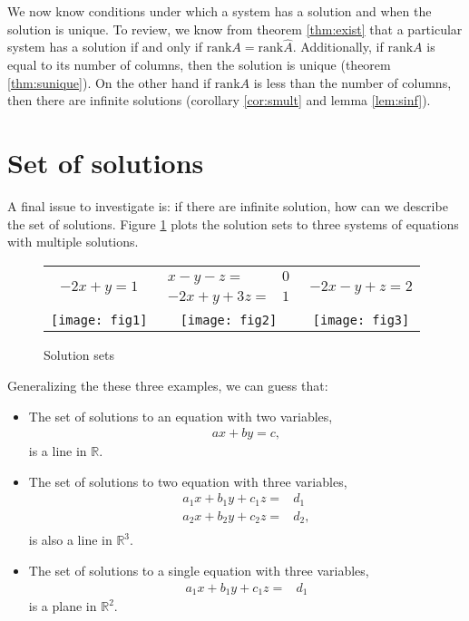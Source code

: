 \documentclass[12pt,reqno]{amsart}
\newcommand{\rank}{\mathrm{rank}}
\theoremstyle{definition}
\begin{document}
We now know conditions under which a system has a solution and when
the solution is unique. To review, we know from theorem
\ref{thm:exist} that a particular system has a solution if and only if
$\rank A = \rank \hat{A}$.  Additionally, if $\rank A$ is equal to its
number of columns, then the solution is unique (theorem
\ref{thm:sunique}).  On the other hand if $\rank A$ is less than the
number of columns, then there are infinite solutions (corollary
\ref{cor:smult} and lemma \ref{lem:sinf}). 

\section{Set of solutions}
A final issue to investigate is: if there are infinite solution, how
can we describe the set of solutions.  Figure \ref{fig:solnSets} plots
the solution sets to three systems of equations with multiple
solutions. 
\begin{figure}\caption{Solution sets \label{fig:solnSets}}
  \begin{tabular}{ccc}
    $-2x + y = 1$
    &
    $\begin{array}{cc} 
      x - y - z = & 0 \\
      -2x + y + 3z = & 1 
    \end{array}$    
    & 
    $
    -2x - y +  z =  2
    $
    \\
    \texttt{[image: fig1]} & 
    \texttt{[image: fig2]} & 
    \texttt{[image: fig3]} 
  \end{tabular}
\end{figure}
Generalizing the these three examples, we can guess that:
\begin{itemize}
\item The set of solutions to an equation with two variables,
  \begin{align*}
    a x + b y = c,
  \end{align*}
  is a line in $\mathbb{R}$.
\item The set of solutions to two equation with
  three variables,
  \begin{align*}
    a_1 x + b_1 y + c_1 z =&  d_1 \\
    a_2 x + b_2 y + c_2 z =&  d_2, \\
  \end{align*}
  is also a line in $\mathbb{R}^3$. 
\item The set of solutions to a single equation with three variables, 
  \begin{align*}
    a_1 x + b_1 y + c_1 z =&  d_1 
  \end{align*}
  is a plane in $\mathbb{R}^2$.
\end{itemize}
\end{document}
